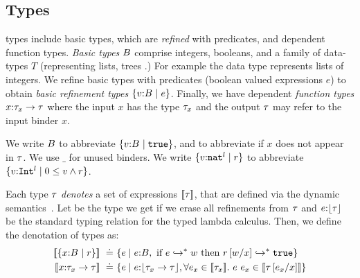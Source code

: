 \subsection{Types}

\undeclang types include basic types, which are \emph{refined} with predicates, 
and dependent function types.
%
\emph{Basic types} $B$ comprise integers, booleans, and a family of data-types 
$T$ (representing lists, trees \etc.)
%
For example the data type \tintlist represents lists of integers.
%
We refine basic types with predicates (boolean valued expressions $e$) to obtain
\emph{basic refinement types} $\{ {v} \text{:} {B^{}} \mid e \}$.
%
Finally, we have dependent \emph{function types} $\tfun{x}{\typ_x}{\typ}$ 
where the input $x$ has the type $\mathit{\tau}_x$ and the output $\mathit{\tau}$ may
refer to the input binder $x$.

 We write $B$ to abbreviate $\{ {v} \text{:} {B^{}} \mid \mathtt{true} \}$, 
and  to abbreviate  if 
$x$ does not appear in $\mathit{\tau}$. 
We use $\_$ for unused binders.
We write $\tref{v}{\tnat}{l}{r}$ to abbreviate $\tref{v}{\tint}{l}{0 \leq v \wedge r}$.


%
Each type $\mathit{\tau}$ \emph{denotes} a set of expressions $[\![\mathit{\tau}]\!]$,
that are defined via the dynamic semantics~\cite{Knowles10}.
%
Let \erase{\typ} be the type we get if we erase all refinements 
from $\mathit{\tau}$ and $e\text{:}\lfloor \mathit{\tau} \rfloor$ be the 
standard typing relation for the typed lambda calculus.
%
Then, we define the denotation of types as: 
\begin{align*}
\interp{\tref{x}{\tbase}{}{r}} \defeq & 
    \{e \mid  \hastypebasesmall{\emptyset}{e}{\tbase},
              \mbox{ if } \evals{e}{w} 
              \mbox{ then } \evals{\SUBST{r}{x}{w}}{\etrue} \}\\
\interp{\tfun{x}{\typ_x}{\typ}} \defeq & 
    \{e \mid  \hastypebasesmall{\emptyset}{e}{\erase{\tfunbasic{\typ_x}{\typ}}}, 
              \forall e_x \in \interp{\typ_x}.\ \eapp{e}{e_x} \in \interp{\typ\sub{x}{e_x}}
    \}
\end{align*}


